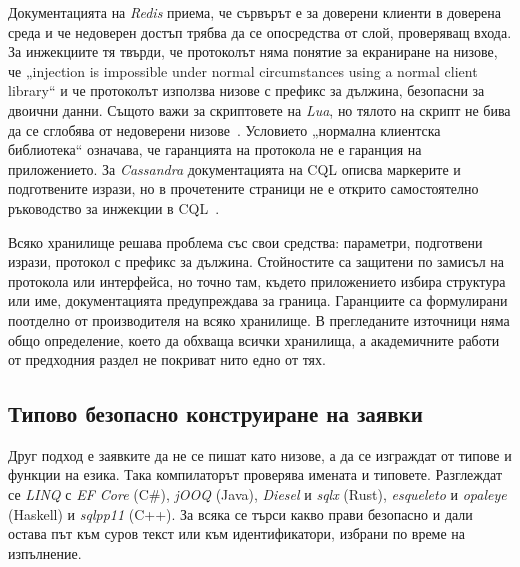 Документацията на \textit{Redis} приема, че сървърът е за доверени клиенти в доверена
среда и че недоверен достъп трябва да се опосредства от слой, проверяващ входа. За
инжекциите тя твърди, че протоколът няма понятие за екраниране на низове, че „injection
is impossible under normal circumstances using a normal client library“ и че протоколът
използва низове с префикс за дължина, безопасни за двоични данни. Същото важи за
скриптовете на \textit{Lua}, но тялото на скрипт не бива да се сглобява от недоверени
низове~\cite{redis_security}. Условието „нормална клиентска библиотека“ означава, че
гаранцията на протокола не е гаранция на приложението. За \textit{Cassandra}
документацията на CQL описва маркерите и подготвените изрази, но в прочетените
страници не е открито самостоятелно ръководство за инжекции в CQL~\cite{cassandra_cql_prepared}.

Всяко хранилище решава проблема със свои средства: параметри, подготвени изрази,
протокол с префикс за дължина. Стойностите са защитени по замисъл на протокола или
интерфейса, но точно там, където приложението избира структура или име,
документацията предупреждава за граница. Гаранциите са формулирани поотделно от
производителя на всяко хранилище. В прегледаните източници няма общо определение,
което да обхваща всички хранилища, а академичните работи от предходния раздел не
покриват нито едно от тях.

\subsection{Типово безопасно конструиране на заявки}
\label{sec:existing-typesafe}

Друг подход е заявките да не се пишат като низове, а да се изграждат от типове и
функции на езика. Така компилаторът проверява имената и типовете. Разглеждат се
\textit{LINQ} с \textit{EF Core} (C\#), \textit{jOOQ} (Java), \textit{Diesel} и
\textit{sqlx} (Rust), \textit{esqueleto} и \textit{opaleye} (Haskell) и
\textit{sqlpp11} (C++). За всяка се търси какво прави безопасно и дали остава път към
суров текст или към идентификатори, избрани по време на изпълнение.

